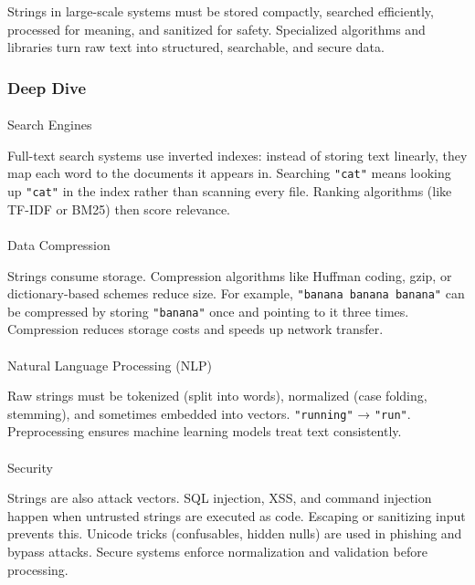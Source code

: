 \documentclass[
  letterpaper,
  DIV=11,
  numbers=noendperiod]{scrreprt}
\makeatletter
\let\oldparagraph\paragraph
\renewcommand{\paragraph}{
    \@ifstar
      \xxxParagraphStar
      \xxxParagraphNoStar
  }
\newcommand{\xxxParagraphStar}[1]{\oldparagraph*{#1}\mbox{}}
\newcommand{\xxxParagraphNoStar}[1]{\oldparagraph{#1}\mbox{}}
\makeatother
\begin{document}
Strings in large-scale systems must be stored compactly, searched
efficiently, processed for meaning, and sanitized for safety.
Specialized algorithms and libraries turn raw text into structured,
searchable, and secure data.

\subsubsection{Deep Dive}\label{deep-dive-36}

\paragraph{Search Engines}\label{search-engines}

Full-text search systems use inverted indexes: instead of storing text
linearly, they map each word to the documents it appears in. Searching
\texttt{"cat"} means looking up \texttt{"cat"} in the index rather than
scanning every file. Ranking algorithms (like TF-IDF or BM25) then score
relevance.

\paragraph{Data Compression}\label{data-compression}

Strings consume storage. Compression algorithms like Huffman coding,
gzip, or dictionary-based schemes reduce size. For example,
\texttt{"banana\ banana\ banana"} can be compressed by storing
\texttt{"banana"} once and pointing to it three times. Compression
reduces storage costs and speeds up network transfer.

\paragraph{Natural Language Processing
(NLP)}\label{natural-language-processing-nlp}

Raw strings must be tokenized (split into words), normalized (case
folding, stemming), and sometimes embedded into vectors.
\texttt{"running"} → \texttt{"run"}. Preprocessing ensures machine
learning models treat text consistently.

\paragraph{Security}\label{security}

Strings are also attack vectors. SQL injection, XSS, and command
injection happen when untrusted strings are executed as code. Escaping
or sanitizing input prevents this. Unicode tricks (confusables, hidden
nulls) are used in phishing and bypass attacks. Secure systems enforce
normalization and validation before processing.
\end{document}
